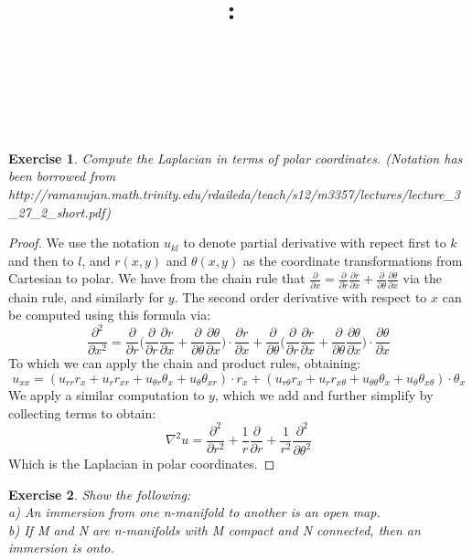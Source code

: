 \documentclass{article}
\title{
    \vspace{2in}
    \textmd{\textbf{\hmwkClass:\ \hmwkTitle}}\\
    \vspace{0.1in}
    \textmd{\hmwkDueDate} \\
    \vspace{0.2in}\large{\textit{\hmwkClassInstructor\  }}
    \vspace{2in}
}
\author{\hmwkAuthorName}
\date{}
\newtheorem{exercise}{Exercise}
\begin{document}
\maketitle

\pagebreak

\begin{exercise}
  Compute the Laplacian in terms of polar coordinates. (Notation has been borrowed from http://ramanujan.math.trinity.edu/rdaileda/teach/s12/m3357/lectures/lecture_3_27_2_short.pdf)
\end{exercise}

\begin{proof}
  We use the notation $u_{kl}$ to denote partial derivative with repect first to $k$ and then to $l$, and $r(x,y)$ and $\theta(x,y)$ as the coordinate transformations from Cartesian to polar.
  We have from the chain rule that $\frac{\partial}{\partial x} = \frac{\partial}{\partial r}\frac{\partial r}{\partial x} + \frac{\partial}{\partial \theta}\frac{\partial \theta}{\partial x}$ via the chain rule, and similarly for $y$. The second order derivative with respect to $x$ can be computed using this formula via:
  \[
    \frac{\partial^{2}}{\partial x^{2}} = \frac{\partial}{\partial r}\Big(\frac{\partial}{\partial r}\frac{\partial r}{\partial x} + \frac{\partial}{\partial \theta}\frac{\partial \theta}{\partial x} \Big)\cdot \frac{\partial r}{\partial x} + \frac{\partial}{\partial \theta}\Big(\frac{\partial}{\partial r}\frac{\partial r}{\partial x} + \frac{\partial}{\partial \theta}\frac{\partial \theta}{\partial x} \Big)\cdot\frac{\partial \theta}{\partial x} 
  \]
  To which we can apply the chain and product rules, obtaining:
  \[
    u_{xx} = (u_{rr}r_{x} + u_{r}r_{xr} + u_{\theta r}\theta_{x} + u_{\theta}\theta_{xr})\cdot r_{x} + (u_{r\theta}r_{x} + u_{r}r_{x\theta} + u_{\theta \theta}\theta_{x} + u_{\theta}\theta_{x \theta})\cdot \theta_{x} 
  \]
  We apply a similar computation to $y$, which we add and further simplify by collecting terms to obtain:
  \[
    \nabla^{2}u = \frac{\partial^{2}}{\partial r^{2}} + \frac{1}{r}\frac{\partial}{\partial r} + \frac{1}{r^{2}}\frac{\partial^{2}}{\partial \theta^{2}}
    \]
Which is the Laplacian in polar coordinates.
\end{proof}

\begin{exercise}
  Show the following: \\ 
  a) An immersion from one n-manifold to another is an open map. \\
  b) If M and N are n-manifolds with M compact and N connected, then an immersion is onto.
\end{exercise}
\end{document}

